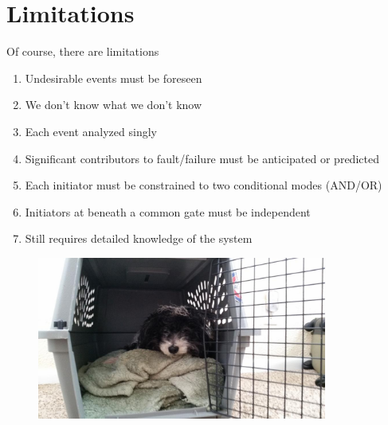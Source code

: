 \documentclass[aspectratio=1610,pdftex,dvipsnames,compress,xcolor={dvipsnames}]{beamer}
\begin{document}
\section{Limitations}


\addtocounter{framenumber}{-1}
\begin{frame}{Of course, there are limitations}
    \begin{enumerate}[series=outerlist,topsep=0pt,itemsep=15pt,leftmargin=*,label=(\arabic*)]
        \item[]Undesirable events must be foreseen  
        \item[]We don't know what we don't know
        \item[]Each event analyzed singly
        \item[]Significant contributors to fault/failure must be anticipated or predicted
        \item[]Each initiator must be constrained to two conditional modes (AND/OR)
        \item[]Initiators at beneath a common gate must be independent 
        \item[]Still requires detailed knowledge of the system
    \end{enumerate}
\end{frame}


\begin{frame}[plain]{}
    \begin{figure}
        \centering
        \includegraphics[width=0.85\textwidth]{final.jpg}
    \end{figure}
\end{frame}
\end{document}
